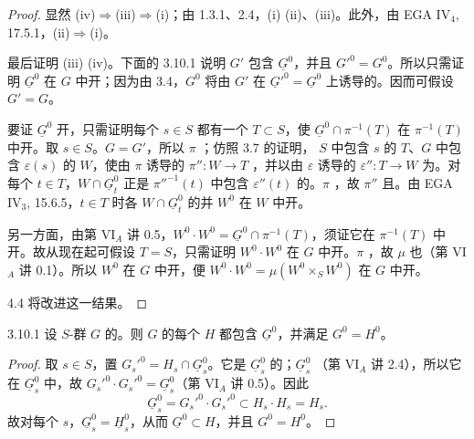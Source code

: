 \begin{proof}
显然 (iv)$\Rightarrow$(iii)$\Rightarrow$(i)；由 1.3.1、2.4，(i)  (ii)、(iii)。此外，由 EGA IV$_4$, 17.5.1，(ii)$\Rightarrow$(i)。

最后证明 (iii)  (iv)。下面的 3.10.1 说明 $G'$ 包含 $\underline G^0$，并且 $G'^0=G^0$。所以只需证明 $\underline G^0$ 在 $G$ 中开；因为由 3.4，$G^0$ 将由 $G'$ 在 $\underline G'^0=\underline G^0$ 上诱导的。因而可假设 $G'=G$。

要证 $\underline G^0$ 开，只需证明每个 $s\in S$ 都有一个 $T\subset S$，使 $\underline G^0\cap\pi^{-1}(T)$ 在 $\pi^{-1}(T)$ 中开。取 $s\in S$。$G=G'$，所以 $\pi$ ；仿照 3.7 的证明， $S$ 中包含 $s$ 的 $T$、$G$ 中包含 $\varepsilon(s)$ 的 $W$，使由 $\pi$ 诱导的 $\pi'':W\to T$ ，并以由 $\varepsilon$ 诱导的 $\varepsilon'':T\to W$ 为。对每个 $t\in T$，$W\cap\underline G_t^0$ 正是 $\pi''^{-1}(t)$ 中包含 $\varepsilon''(t)$ 的。$\pi$ ，故 $\pi''$ 且。由 EGA IV$_3$, 15.6.5，$t\in T$ 时各 $W\cap\underline G_t^0$ 的并 $W^0$ 在 $W$ 中开。

另一方面，由第 VI$_A$ 讲 0.5，$W^0\cdot W^0=\underline G^0\cap\pi^{-1}(T)$，须证它在 $\pi^{-1}(T)$ 中开。故从现在起可假设 $T=S$，只需证明 $W^0\cdot W^0$ 在 $G$ 中开。$\pi$ ，故 $\mu$ 也（第 VI$_A$ 讲 0.1）。所以 $W^0$ 在 $G$ 中开，便 $W^0\cdot W^0=\mu(W^0\times_SW^0)$ 在 $G$ 中开。

4.4 将改进这一结果。
\end{proof}
\begin{SGAresult}{}{3.10.1}
设 $S$-群 $G$ 的。则 $G$ 的每个 $H$ 都包含 $\underline G^0$，并满足 $G^0=H^0$。
\end{SGAresult}
\begin{proof}
取 $s\in S$，置 $G_s'^0=H_s\cap\underline G_s^0$。它是 $\underline G_s^0$ 的；$\underline G_s^0$ （第 VI$_A$ 讲 2.4），所以它在 $\underline G_s^0$ 中，故 $G_s'^0\cdot G_s'^0=\underline G_s^0$（第 VI$_A$ 讲 0.5）。因此
\[
\underline G_s^0=G_s'^0\cdot G_s'^0\subset H_s\cdot H_s=H_s.
\]
故对每个 $s$，$\underline G_s^0=\underline H_s^0$，从而 $\underline G^0\subset H$，并且 $G^0=H^0$。
\end{proof}
